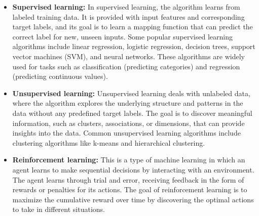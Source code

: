 \documentclass{vgtc}                          %
\begin{document}
\begin{itemize}
  \item \textbf{Supervised learning:} In supervised learning, the algorithm learns from labeled training data. It is provided with input features and corresponding target labels, and its goal is to 
  learn a mapping function that can predict the correct label for new, unseen inputs. Some popular supervised learning algorithms include linear regression, logistic regression, decision trees, 
  support vector machines (SVM), and neural networks. These algorithms are widely used for tasks such as classification (predicting categories) and regression (predicting continuous values).
  \item \textbf{Unsupervised learning:} Unsupervised learning deals with unlabeled data, where the algorithm explores the underlying structure and patterns in the data without any predefined 
  target labels. The goal is to discover meaningful information, such as clusters, associations, or dimensions, that can provide insights into the data. Common unsupervised learning algorithms 
  include clustering algorithms like k-means and hierarchical clustering.
  \item \textbf{Reinforcement learning:} This is a type of machine learning in which an agent learns to make sequential decisions by interacting with an environment. The agent learns through 
  trial and error, receiving feedback in the form of rewards or penalties for its actions. The goal of reinforcement learning is to maximize the cumulative reward over time by discovering the 
  optimal actions to take in different situations.
\end{itemize} 
\end{document}
